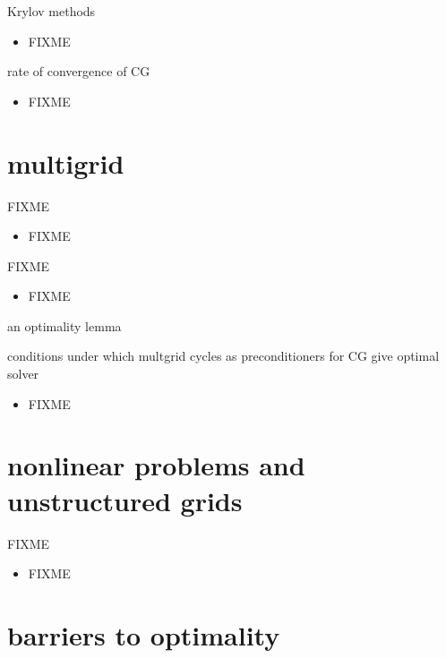 \documentclass[hide notes,intlimits,usenames,dvipsnames]{beamer}
\begin{document}
\begin{frame}{Krylov methods}
\begin{itemize}
\item FIXME
\end{itemize}
\end{frame}

\begin{frame}{rate of convergence of CG}
\begin{itemize}
\item FIXME
\end{itemize}
\end{frame}


\section{multigrid}

\begin{frame}{FIXME}
\begin{itemize}
\item FIXME
\end{itemize}
\end{frame}

\begin{frame}{FIXME}
\begin{itemize}
\item FIXME
\end{itemize}
\end{frame}

\begin{frame}{an optimality lemma}

conditions under which multgrid cycles as preconditioners for CG give optimal solver
\begin{itemize}
\item FIXME
\end{itemize}
\end{frame}


\section{nonlinear problems and unstructured grids}

\begin{frame}{FIXME}
\begin{itemize}
\item FIXME
\end{itemize}
\end{frame}



\section{barriers to optimality}
\end{document}
